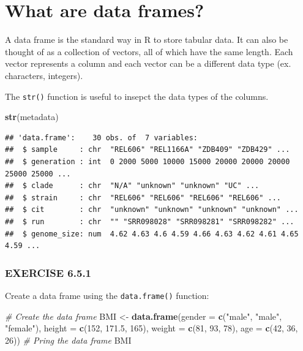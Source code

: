 \documentclass[
]{book}
\newenvironment{Shaded}{\begin{snugshade}}{\end{snugshade}}
\newcommand{\AttributeTok}[1]{\textcolor[rgb]{0.13,0.29,0.53}{#1}}
\newcommand{\CommentTok}[1]{\textcolor[rgb]{0.56,0.35,0.01}{\textit{#1}}}
\newcommand{\DecValTok}[1]{\textcolor[rgb]{0.00,0.00,0.81}{#1}}
\newcommand{\FloatTok}[1]{\textcolor[rgb]{0.00,0.00,0.81}{#1}}
\newcommand{\FunctionTok}[1]{\textcolor[rgb]{0.13,0.29,0.53}{\textbf{#1}}}
\newcommand{\NormalTok}[1]{#1}
\newcommand{\OtherTok}[1]{\textcolor[rgb]{0.56,0.35,0.01}{#1}}
\newcommand{\StringTok}[1]{\textcolor[rgb]{0.31,0.60,0.02}{#1}}
\begin{document}
\section{What are data frames?}\label{what-are-data-frames}

A data frame is the standard way in R to store tabular data. It can also be thought of as a collection of vectors, all of which have the same length. Each vector represents a column and each vector can be a different data type (ex. characters, integers).

The \texttt{str()} function is useful to insepct the data types of the columns.

\begin{Shaded}
\begin{Highlighting}[]
\FunctionTok{str}\NormalTok{(metadata)}
\end{Highlighting}
\end{Shaded}

\begin{verbatim}
## 'data.frame':    30 obs. of  7 variables:
##  $ sample     : chr  "REL606" "REL1166A" "ZDB409" "ZDB429" ...
##  $ generation : int  0 2000 5000 10000 15000 20000 20000 20000 25000 25000 ...
##  $ clade      : chr  "N/A" "unknown" "unknown" "UC" ...
##  $ strain     : chr  "REL606" "REL606" "REL606" "REL606" ...
##  $ cit        : chr  "unknown" "unknown" "unknown" "unknown" ...
##  $ run        : chr  "" "SRR098028" "SRR098281" "SRR098282" ...
##  $ genome_size: num  4.62 4.63 4.6 4.59 4.66 4.63 4.62 4.61 4.65 4.59 ...
\end{verbatim}

\subsubsection*{EXERCISE 6.5.1}\label{exercise-6.5.1}

Create a data frame using the \texttt{data.frame()} function:

\begin{Shaded}
\begin{Highlighting}[]
\CommentTok{\# Create the data frame}
\NormalTok{BMI }\OtherTok{\textless{}{-}} \FunctionTok{data.frame}\NormalTok{(}\AttributeTok{gender =} \FunctionTok{c}\NormalTok{(}\StringTok{"male"}\NormalTok{, }\StringTok{"male"}\NormalTok{, }\StringTok{"female"}\NormalTok{), }\AttributeTok{height =} \FunctionTok{c}\NormalTok{(}\DecValTok{152}\NormalTok{, }\FloatTok{171.5}\NormalTok{, }\DecValTok{165}\NormalTok{), }\AttributeTok{weight =} \FunctionTok{c}\NormalTok{(}\DecValTok{81}\NormalTok{, }\DecValTok{93}\NormalTok{, }\DecValTok{78}\NormalTok{), }\AttributeTok{age =} \FunctionTok{c}\NormalTok{(}\DecValTok{42}\NormalTok{, }\DecValTok{36}\NormalTok{, }\DecValTok{26}\NormalTok{))}
\CommentTok{\# Pring the data frame}
\NormalTok{BMI}
\end{Highlighting}
\end{Shaded}
\end{document}
